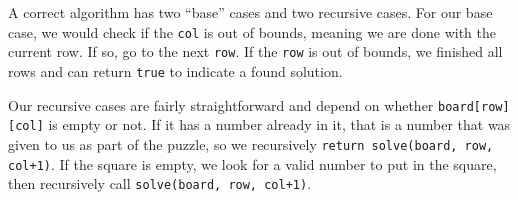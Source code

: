 A correct algorithm has two ``base'' cases and two recursive cases. For our base case, we would check if the \texttt{col} is out of bounds, meaning we are done with the current row.  If so, go to the next \texttt{row}.  If the \texttt{row} is out of bounds, we finished all rows and can return \texttt{true} to indicate a found solution.

Our recursive cases are fairly straightforward and depend on whether \texttt{board[row][col]} is empty or not.  If it has a number already in it, that is a number that was given to us as part of the puzzle, so we recursively \texttt{return solve(board, row, col+1)}.  If the square is empty, we look for a valid number to put in the square, then recursively call \texttt{solve(board, row, col+1)}.








%
%
%
%
%
%
%

